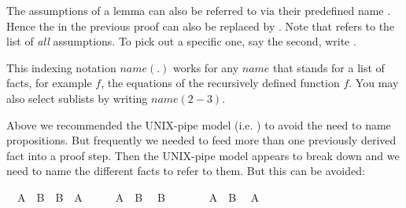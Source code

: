 \begin{isabellebody}
\begin{isamarkuptext}
The assumptions of a lemma can also be referred to via their
predefined name . Hence the  in the
previous proof can also be replaced by . Note that  refers to the list of \emph{all} assumptions. To pick out a
specific one, say the second, write .

This indexing notation $name(.)$ works for any $name$ that stands for
a list of facts, for example $f$, the equations of the
recursively defined function $f$. You may also select sublists by writing
$name(2-3)$.

Above we recommended the UNIX-pipe model (i.e. ) to avoid
the need to name propositions. But frequently we needed to feed more
than one previously derived fact into a proof step. Then the UNIX-pipe
model appears to break down and we need to name the different facts to
refer to them. But this can be avoided:%
\end{isamarkuptext}%
\isamarkuptrue%
\isamarkupfalse%
\ \ {}A\ {}\ B{}\ \ {}B\ {}\ A{}\isanewline
%
\isadelimproof
%
\endisadelimproof
%
\isatagproof
{}\isamarkupfalse%
\ {}\isanewline
\ \ \isamarkupfalse%
\ {}A\ {}\ B{}\ \isamarkupfalse%
\ {}B{}\ \isamarkupfalse%
\isanewline
\ \ \isamarkupfalse%
\isanewline
\ \ \isamarkupfalse%
\ {}A\ {}\ B{}\ \isamarkupfalse%
\ {}A{}\ \isamarkupfalse%
\isanewline
\ \ \isamarkupfalse%

\end{isabellebody}
